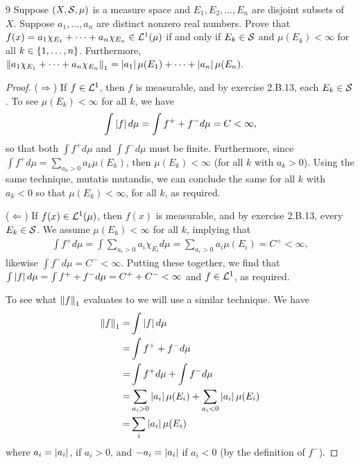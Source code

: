\begin{exercise}{9}
Suppose $(X, \mathcal{S}, \mu)$ is a measure space and $E_1, E_2, \dots, E_n$ are disjoint subsets of $X$.
Suppose $a_1, \dots, a_n$ are distinct nonzero real numbers.
Prove that $f(x) = a_1 \chi_{E_1} + \dots + a_n \chi_{E_n} \in \mathcal{L}^1(\mu)$ if and only if $E_k \in \mathcal{S}$ and $\mu(E_k) < \infty$ for all $k \in \{1, \dots, n\}$.
Furthermore, $\left\lVert a_1 \chi_{E_1} + \dots + a_n \chi_{E_n}\right\rVert_1 = \left\lvert a_1\right\rvert \mu(E_1) + \dots + \left\lvert a_n\right\rvert \mu(E_n).$
\end{exercise}
\begin{proof}
($\Rightarrow$)
If $f \in \mathcal{L}^1$, then $f$ is measurable, and by exercise 2.B.13, each $E_k \in \mathcal{S}$. To see $\mu(E_k) < \infty$ for all $k$, we have
\begin{align*}
    \int \left\lvert f\right\rvert d\mu
    = \int f^+ + f^- d\mu
    = C < \infty,
\end{align*}
so that both $\int f^+ d\mu$ and $\int f^- d\mu$ must be finite.
Furthermore, since $\int f^+ d\mu = \sum_{a_k > 0} a_k \mu(E_k)$, then $\mu(E_k) < \infty$ (for all $k$ with $a_k > 0$).
Using the same technique, mutatis mutandis, we can conclude the same for all $k$ with $a_k < 0$ so that $\mu(E_k)  < \infty$, for all $k$, as required.

($\Leftarrow$)
If $f(x) \in \mathcal{L}^1(\mu)$, then $f(x)$ is measurable, and by exercise 2.B.13, every $E_k \in \mathcal{S}$.
We assume $\mu(E_k) < \infty$ for all $k$, implying that 
\begin{align*}
    \int f^+ d\mu
    = \int \sum_{a_i > 0} a_i \chi_{E_i} d\mu
    = \sum_{a_i > 0} a_i \mu(E_i)
    = C^+ < \infty,
\end{align*}
likewise $\int f^- d\mu = C^- < \infty$.
Putting these together, we find that $\int \left\lvert f\right\rvert d\mu = \int f^+ + f^- d\mu = C^+ + C^- < \infty$ and $f \in \mathcal{L}^1$, as required.

To see what $\left\lVert f\right\rVert_1$ evaluates to we will use a similar technique.
We have 
\begin{align*}
    \left\lVert f\right\rVert_1
    =& \int \left\lvert f\right\rvert d\mu\\
    =& \int f^+ + f^- d\mu\\
    =& \int f^+ d\mu + \int f^- d\mu\\
    =& \sum_{a_i > 0} \left\lvert a_i\right\rvert \mu(E_i) + \sum_{a_i < 0} \left\lvert a_i\right\rvert \mu(E_i)\\
    =& \sum_i \left\lvert a_i\right\rvert \mu(E_i)
\end{align*}
where $a_i = \left\lvert a_i\right\rvert$, if $a_i > 0$, and $-a_i = \left\lvert a_i\right\rvert$ if $a_i < 0$ (by the definition of $f^-$).
\end{proof} 

